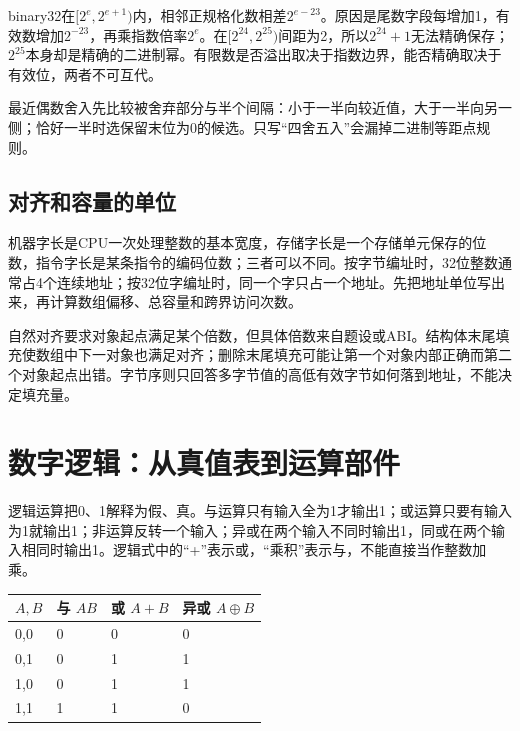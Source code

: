 binary32在\([2^e,2^{e+1})\)内，相邻正规格化数相差\(2^{e-23}\)。原因是尾数字段每增加1，有效数增加\(2^{-23}\)，再乘指数倍率\(2^e\)。在\([2^{24},2^{25})\)间距为2，所以\(2^{24}+1\)无法精确保存；\(2^{25}\)本身却是精确的二进制幂。有限数是否溢出取决于指数边界，能否精确取决于有效位，两者不可互代。

最近偶数舍入先比较被舍弃部分与半个间隔：小于一半向较近值，大于一半向另一侧；恰好一半时选保留末位为0的候选。只写``四舍五入''会漏掉二进制等距点规则。

\subsection{对齐和容量的单位}\label{CO02-storage}

机器字长是CPU一次处理整数的基本宽度，存储字长是一个存储单元保存的位数，指令字长是某条指令的编码位数；三者可以不同。按字节编址时，32位整数通常占4个连续地址；按32位字编址时，同一个字只占一个地址。先把地址单位写出来，再计算数组偏移、总容量和跨界访问次数。

自然对齐要求对象起点满足某个倍数，但具体倍数来自题设或ABI。结构体末尾填充使数组中下一对象也满足对齐；删除末尾填充可能让第一个对象内部正确而第二个对象起点出错。字节序则只回答多字节值的高低有效字节如何落到地址，不能决定填充量。

\section{数字逻辑：从真值表到运算部件}\label{CO02-digital-logic}

逻辑运算把0、1解释为假、真。与运算只有输入全为1才输出1；或运算只要有输入为1就输出1；非运算反转一个输入；异或在两个输入不同时输出1，同或在两个输入相同时输出1。逻辑式中的``+''表示或，``乘积''表示与，不能直接当作整数加乘。

\begin{wideblock}\par\medskip\noindent\begin{minipage}{\linewidth}\fontsize{9.3}{12}\selectfont\begin{tabularx}{\linewidth}{@{}YYYY@{}}
\toprule\noalign{}
\(A,B\) & 与 \(AB\) & 或 \(A+B\) & 异或 \(A\oplus B\) \\
\midrule\noalign{}


0,0 & 0 & 0 & 0 \\
0,1 & 0 & 1 & 1 \\
1,0 & 0 & 1 & 1 \\
1,1 & 1 & 1 & 0 \\
\bottomrule\end{tabularx}
\end{minipage}\par\medskip\end{wideblock}

